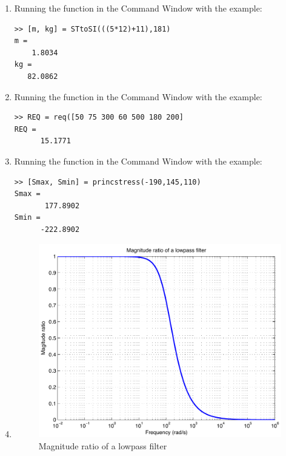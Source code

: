 \begin{enumerate}
\newpage
\item 
Running the function in the Command Window with the example:
\begin{lstlisting}
>> [m, kg] = STtoSI(((5*12)+11),181)
m = 
    1.8034
kg = 
   82.0862
\end{lstlisting}

\newpage
\item 
Running the function in the Command Window with the example:
\begin{lstlisting}
>> REQ = req([50 75 300 60 500 180 200]
REQ = 
      15.1771
\end{lstlisting}

\item 
Running the function in the Command Window with the example:
\begin{lstlisting}
>> [Smax, Smin] = princstress(-190,145,110)
Smax = 
       177.8902
Smin = 
      -222.8902
\end{lstlisting}

\newpage
\item 

\begin{figure}[h]
	\myfloatalign
	\includegraphics[width=\linewidth]{Graphics/Additional-Ex/lowpass-plot}
	\caption{Magnitude ratio of a lowpass filter}
	\label{fig:lowpass-plot}
\end{figure}


\end{enumerate}
